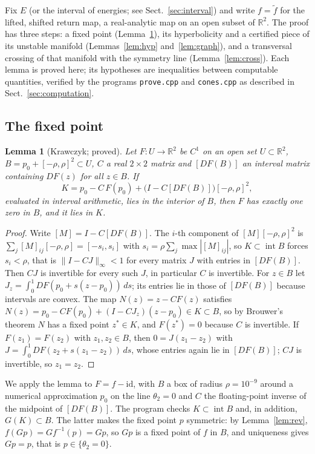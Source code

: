 \documentclass[11pt]{article}
\newtheorem{lemma}{Lemma}
\theoremstyle{definition}
\newcommand{\R}{\mathbb{R}}
\newcommand{\tf}{\tilde f}
\begin{document}
Fix $E$ (or the interval of energies; see Sect.~\ref{sec:interval}) and write $f = \tf$ for the lifted, shifted return map, a real-analytic map on an open subset of $\R^2$. The proof has three steps: a fixed point (Lemma~\ref{lem:kraw}), its hyperbolicity and a certified piece of its unstable manifold (Lemmas~\ref{lem:hyp} and~\ref{lem:graph}), and a transversal crossing of that manifold with the symmetry line (Lemma~\ref{lem:cross}). Each lemma is proved here; its hypotheses are inequalities between computable quantities, verified by the programs \texttt{prove.cpp} and \texttt{cones.cpp} as described in Sect.~\ref{sec:computation}.

\subsection{The fixed point}

\begin{lemma}[Krawczyk; proved]\label{lem:kraw}
Let $F: U \to \R^2$ be $C^1$ on an open set $U \subset \R^2$, $B = p_0 + [-\rho, \rho]^2 \subset U$, $C$ a real $2 \times 2$ matrix and $[DF(B)]$ an interval matrix containing $DF(z)$ for all $z \in B$. If
\[
  K = p_0 - C\,F(p_0) + \bigl(I - C[DF(B)]\bigr)[-\rho, \rho]^2 ,
\]
evaluated in interval arithmetic, lies in the interior of $B$, then $F$ has exactly one zero in $B$, and it lies in $K$.
\end{lemma}

\begin{proof}
Write $[M] = I - C[DF(B)]$. The $i$-th component of $[M][-\rho, \rho]^2$ is $\sum_j [M]_{ij}[-\rho, \rho] = [-s_i, s_i]$ with $s_i = \rho\sum_j\max|[M]_{ij}|$, so $K \subset \operatorname{int}B$ forces $s_i < \rho$, that is $\|I - CJ\|_\infty < 1$ for every matrix $J$ with entries in $[DF(B)]$. Then $CJ$ is invertible for every such $J$, in particular $C$ is invertible. For $z \in B$ let $J_z = \int_0^1 DF(p_0 + s(z - p_0))\,ds$; its entries lie in those of $[DF(B)]$ because intervals are convex. The map $N(z) = z - CF(z)$ satisfies $N(z) = p_0 - CF(p_0) + (I - CJ_z)(z - p_0) \in K \subset B$, so by Brouwer's theorem $N$ has a fixed point $z^* \in K$, and $F(z^*) = 0$ because $C$ is invertible. If $F(z_1) = F(z_2)$ with $z_1, z_2 \in B$, then $0 = J(z_1 - z_2)$ with $J = \int_0^1 DF(z_2 + s(z_1 - z_2))\,ds$, whose entries again lie in $[DF(B)]$; $CJ$ is invertible, so $z_1 = z_2$.
\end{proof}

We apply the lemma to $F = f - \mathrm{id}$, with $B$ a box of radius $\rho = 10^{-9}$ around a numerical approximation $p_0$ on the line $\theta_2 = 0$ and $C$ the floating-point inverse of the midpoint of $[DF(B)]$. The program checks $K \subset \operatorname{int} B$ and, in addition, $G(K) \subset B$. The latter makes the fixed point $p$ symmetric: by Lemma~\ref{lem:rev}, $f(Gp) = G f^{-1}(p) = Gp$, so $Gp$ is a fixed point of $f$ in $B$, and uniqueness gives $Gp = p$, that is $p \in \{\theta_2 = 0\}$.
\end{document}
